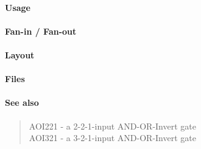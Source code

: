 \paragraph{Usage}

\paragraph{Fan-in / Fan-out}

\paragraph{Layout}

\paragraph{Files}

\paragraph{See also}
\begin{quote}
    AOI221 - a 2-2-1-input AND-OR-Invert gate \\
    AOI321 - a 3-2-1-input AND-OR-Invert gate
\end{quote}

